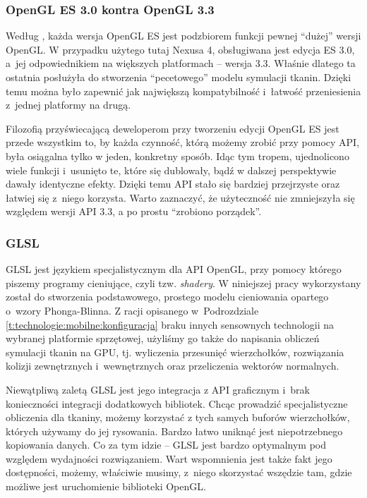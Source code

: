 			\subsubsection{OpenGL ES 3.0 kontra OpenGL 3.3}
			\label{t:technologie:narzedzia:ogl:vs}
			
			Według \cite{oglspec}, każda wersja OpenGL ES jest podzbiorem funkcji pewnej ``dużej'' wersji OpenGL. W przypadku użytego tutaj Nexusa 4, obsługiwana jest edycja ES 3.0, a~jej odpowiednikiem na większych platformach -- wersja 3.3. Właśnie dlatego ta ostatnia posłużyła do stworzenia ``pecetowego'' modelu symulacji tkanin. Dzięki temu można było zapewnić jak największą kompatybilność i~łatwość przeniesienia z~jednej platformy na drugą.
			
			Filozofią przyświecającą deweloperom przy tworzeniu edycji OpenGL ES jest przede wszystkim to, by każda czynność, którą możemy zrobić przy pomocy API, była osiągalna tylko w jeden, konkretny sposób. Idąc tym tropem, ujednolicono wiele funkcji i~usunięto te, które się dublowały, bądź w dalszej perspektywie dawały identyczne efekty. Dzięki temu API stało się bardziej przejrzyste oraz łatwiej się z~niego korzysta. Warto zaznaczyć, że użyteczność nie zmniejszyła się względem wersji API 3.3, a po prostu ``zrobiono porządek''.
			
			\subsubsection{GLSL}
			\label{t:technologie:narzedzia:ogl:glsl}
			
			
			GLSL jest językiem specjalistycznym dla API OpenGL, przy pomocy którego piszemy programy cieniujące, czyli tzw. \emph{shadery}. W niniejszej pracy wykorzystany został do stworzenia podstawowego, prostego modelu cieniowania opartego o~wzory Phonga-Blinna. Z racji opisanego w~Podrozdziale \ref{t:technologie:mobilne:konfiguracja} braku innych sensownych technologii na wybranej platformie sprzętowej, użyliśmy go także do napisania obliczeń symulacji tkanin na GPU, tj. wyliczenia przesunięć wierzchołków, rozwiązania kolizji zewnętrznych i~wewnętrznych oraz przeliczenia wektorów normalnych.
			
			Niewątpliwą zaletą GLSL jest jego integracja z API graficznym i~brak konieczności integracji dodatkowych bibliotek. Chcąc prowadzić specjalistyczne obliczenia dla tkaniny, możemy korzystać z tych samych buforów wierzchołków, których używamy do jej rysowania. Bardzo łatwo uniknąć jest niepotrzebnego kopiowania danych. Co za tym idzie -- GLSL jest bardzo optymalnym pod względem wydajności rozwiązaniem. Wart wspomnienia jest także fakt jego dostępności, możemy, właściwie musimy, z~niego skorzystać wszędzie tam, gdzie możliwe jest uruchomienie biblioteki OpenGL. 
			
